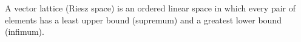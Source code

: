 A vector lattice (Riesz space) is an ordered linear space in which every pair of elements has a least upper bound (supremum) and a greatest lower bound (infimum).

